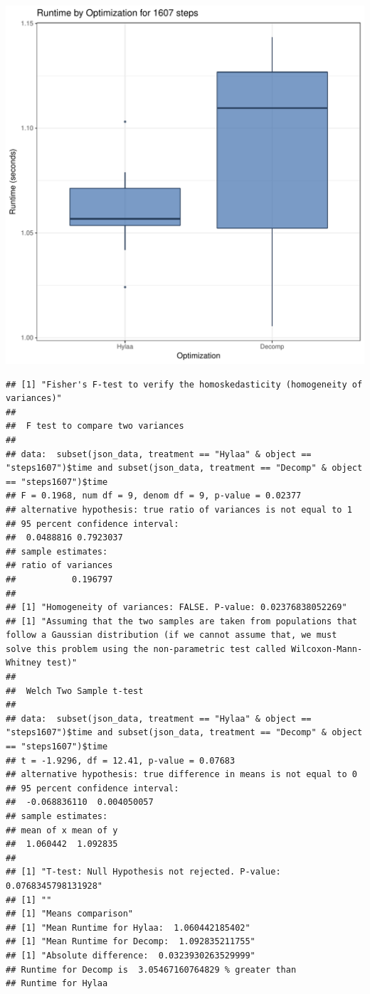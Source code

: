 \documentclass{article}\usepackage[]{graphicx}\usepackage[]{color}
\makeatletter
\def\maxwidth{ %
  \ifdim\Gin@nat@width>\linewidth
    \linewidth
  \else
    \Gin@nat@width
  \fi
}
\newenvironment{kframe}{%
 \def\at@end@of@kframe{}%
 \ifinner\ifhmode%
  \def\at@end@of@kframe{\end{minipage}}%
  \begin{minipage}{\columnwidth}%
 \fi\fi%
 \def\FrameCommand##1{\hskip\@totalleftmargin \hskip-\fboxsep
 \colorbox{shadecolor}{##1}\hskip-\fboxsep
     \hskip-\linewidth \hskip-\@totalleftmargin \hskip\columnwidth}%
 \MakeFramed {\advance\hsize-\width
   \@totalleftmargin\z@ \linewidth\hsize
   \@setminipage}}%
 {\par\unskip\endMakeFramed%
 \at@end@of@kframe}
\newenvironment{knitrout}{}{} %
\makeatother
\begin{document}
\begin{knitrout}
\color{fgcolor}
\includegraphics[width=\maxwidth]{figure/RH2_steps1607-1} 
\begin{kframe}\begin{verbatim}
## [1] "Fisher's F-test to verify the homoskedasticity (homogeneity of variances)"
## 
## 	F test to compare two variances
## 
## data:  subset(json_data, treatment == "Hylaa" & object == "steps1607")$time and subset(json_data, treatment == "Decomp" & object == "steps1607")$time
## F = 0.1968, num df = 9, denom df = 9, p-value = 0.02377
## alternative hypothesis: true ratio of variances is not equal to 1
## 95 percent confidence interval:
##  0.0488816 0.7923037
## sample estimates:
## ratio of variances 
##           0.196797 
## 
## [1] "Homogeneity of variances: FALSE. P-value: 0.02376838052269"
## [1] "Assuming that the two samples are taken from populations that follow a Gaussian distribution (if we cannot assume that, we must solve this problem using the non-parametric test called Wilcoxon-Mann-Whitney test)"
## 
## 	Welch Two Sample t-test
## 
## data:  subset(json_data, treatment == "Hylaa" & object == "steps1607")$time and subset(json_data, treatment == "Decomp" & object == "steps1607")$time
## t = -1.9296, df = 12.41, p-value = 0.07683
## alternative hypothesis: true difference in means is not equal to 0
## 95 percent confidence interval:
##  -0.068836110  0.004050057
## sample estimates:
## mean of x mean of y 
##  1.060442  1.092835 
## 
## [1] "T-test: Null Hypothesis not rejected. P-value: 0.0768345798131928"
## [1] ""
## [1] "Means comparison"
## [1] "Mean Runtime for Hylaa:  1.060442185402"
## [1] "Mean Runtime for Decomp:  1.092835211755"
## [1] "Absolute difference:  0.0323930263529999"
## Runtime for Decomp is  3.05467160764829 % greater than 
## Runtime for Hylaa
\end{verbatim}
\end{kframe}
\end{knitrout}
\end{document}
